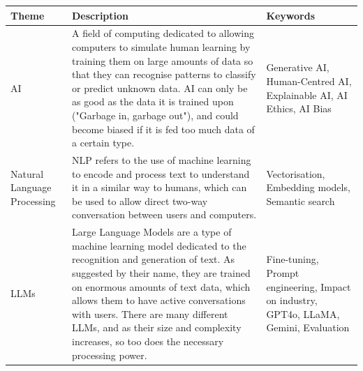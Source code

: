 \documentclass[12pt]{report}
\begin{document}
    \begin{table}[H]
        \centering
        \begin{tabular}{|p{}|p{} | p{}|}
            \hline
            \cellcolor{blue!25}Theme & \cellcolor{blue!25}Description &
            \cellcolor{blue!25}Keywords \\

            \hline

            AI & A field of computing dedicated to allowing computers to simulate human
            learning by training them on large amounts of data so that they can recognise patterns to classify or 
            predict unknown data. AI can only be as good as the data it is trained upon ("Garbage in, garbage out"), and could
            become \newline biased if it is fed too much data of a certain type. & Generative AI, 
            Human-Centred AI, Explainable AI, AI Ethics, AI Bias \\



            \hline

            Natural Language Processing & NLP refers to the use of machine learning to encode and 
            process text to understand it in a similar way to humans, which can be used to allow direct 
            two-way conversation between users and computers. & Vectorisation, Embedding models,
            Semantic search

            \\

            \hline
            
            LLMs & Large Language Models are a type of machine learning model dedicated to the recognition and generation of text.
            As suggested by their name, they are trained on enormous amounts of text data, which allows them 
            to have active conversations with users. There are many different LLMs, and as their size and 
            complexity increases, so too does the necessary processing power. &
            Fine-tuning, Prompt engineering, Impact on industry,
            GPT4o, LLaMA, Gemini, Evaluation
            

\end{tabular}
\end{table}
\end{document}
